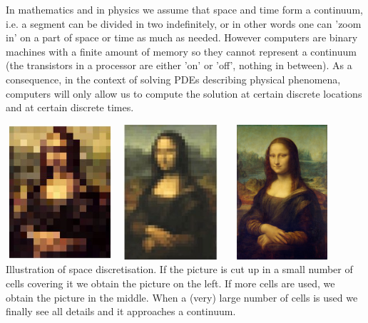 
In mathematics and in physics we assume that space and time form a continuum, i.e.
a segment can be divided in two indefinitely, or in other words one can 'zoom in'
on a part of space or time as much as needed. 
However computers are binary machines with a finite amount of memory so they 
cannot represent a continuum (the transistors in a processor are either 'on' or 'off', 
nothing in between). As a consequence, in the context of solving PDEs
describing physical phenomena, computers will only allow us to compute the solution 
at certain discrete locations and at certain discrete times. 

\begin{center}
\includegraphics[width=4cm,height=5cm]{images/discrete/monalisa1.jpg}
\includegraphics[width=4cm,height=5cm]{images/discrete/monalisa2.jpg}
\includegraphics[width=4cm,height=5cm]{images/discrete/monalisa3.jpg}\\
{\captionfont Illustration of space discretisation. If the picture is cut up 
in a small number of cells covering it we obtain the picture on the left.
If more cells are used, we obtain the picture in the middle. When a (very) large
number of cells is used we finally see all details and it approaches a continuum.}
\end{center}


